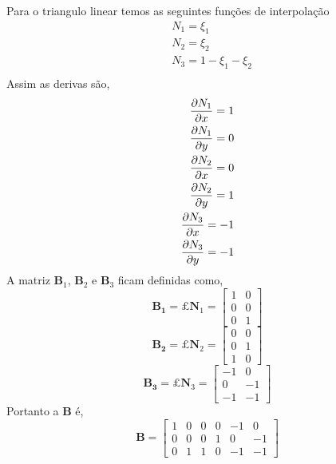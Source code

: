 %
Para o triangulo linear temos as seguintes funções de interpolação
%
\begin{equation}
	\begin{split}
		&N_1 = \xi_1\\ 
		&N_2 = \xi_2\\ 
		&N_3 = 1 - \xi_1 - \xi_2\\ 
	\end{split}
\end{equation}
%
Assim as derivas são,
%
\begin{equation}
	\begin{split}
		\frac{\partial N_1}{\partial x} = 1\\
		\frac{\partial N_1}{\partial y} = 0\\
		\frac{\partial N_2}{\partial x} = 0\\
		\frac{\partial N_2}{\partial y} = 1\\
		\frac{\partial N_3}{\partial x} = -1\\
		\frac{\partial N_3}{\partial y} = -1
	\end{split}
\end{equation}
%
A matriz $\mathbf{B}_1$, $\mathbf{B}_2$ e $\mathbf{B}_3$ ficam definidas como,
%
\begin{equation}
	\mathbf{B_1} = \pounds \mathbf{N}_1 = 
	\begin{bmatrix}
		1& 0\\
		0& 0\\
		0& 1
	\end{bmatrix}
\end{equation}
%
\begin{equation}
	\mathbf{B_2} = \pounds \mathbf{N}_2 = 
	\begin{bmatrix}
		0& 0\\
		0& 1\\
		1& 0
	\end{bmatrix}
\end{equation}
%
\begin{equation}
	\mathbf{B_3} = \pounds \mathbf{N}_3 = 
	\begin{bmatrix}
		-1& 0\\
		0& -1\\
		-1& -1
	\end{bmatrix}
\end{equation}
%
Portanto a $\mathbf{B}$ é,
%
\begin{equation}
	\mathbf{B} = 
	\begin{bmatrix}
		 1& 0   & 0 & 0 & -1 & 0\\
		 0& 0  & 0 & 1 &  0 & -1\\
		 0& 1  & 1 & 0 & -1 & -1
	\end{bmatrix}
\end{equation}
